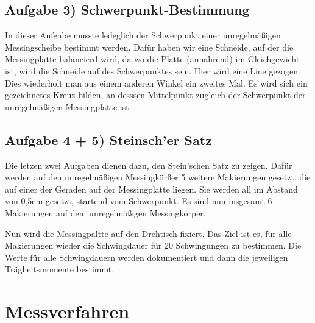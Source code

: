 \subsection*{Aufgabe 3) Schwerpunkt-Bestimmung}
In dieser Aufgabe musste ledeglich der Schwerpunkt einer unregelmäßigen Messingscheibe bestimmt werden.
Dafür haben wir eine Schneide, auf der die Messingplatte balancierd wird, da wo die Platte (annährend) im Gleichgewicht ist,
wird die Schneide auf des Schwerpunktes sein. Hier wird eine Line gezogen. Dies wiederholt man aus einem anderen Winkel ein zweites Mal.
Es wird sich ein gezeichnetes Kreuz bilden, an desssen Mittelpunkt zugleich der Schwerpunkt der unregelmäßigen Messingplatte ist.

\subsection*{Aufgabe 4 + 5) Steinsch'er Satz}
Die letzen zwei Aufgaben dienen dazu, den Stein'schen Satz zu zeigen. Dafür werden auf den unregelmäßigen Messingkörßer
5 weitere Makierungen gesetzt, die auf einer der Geraden auf der Messingplatte liegen. Sie werden all im Abstand von 0,5cm gesetzt, startend vom Schwerpunkt.
Es sind nun insgesamt 6 Makierungen auf dem unregelmäßigen Messingkörper. 

Nun wird die Messingpaltte auf den Drehtisch fixiert. 
Das Ziel ist es, für alle Makierungen wieder die Schwingdauer für 20 Schwingungen zu bestimmen. 
Die Werte für alle Schwingdauern werden dokumentiert und dann die jeweiligen Trägheitsmomente bestimmt.

\section{Messverfahren}
